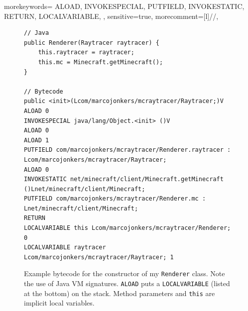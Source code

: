 \documentclass[]{article}
\begin{document}

{
  morekeywords={
    ALOAD,
    INVOKESPECIAL,
    PUTFIELD,
    INVOKESTATIC,
    RETURN,
    LOCALVARIABLE,
  },
  sensitive=true, %
  morecomment=[l]{//}, %
}
\begin{figure}
\begin{lstlisting}[breaklines,frame=single]
// Java
public Renderer(Raytracer raytracer) {
    this.raytracer = raytracer;
    this.mc = Minecraft.getMinecraft();
}

// Bytecode
public <init>(Lcom/marcojonkers/mcraytracer/Raytracer;)V
ALOAD 0
INVOKESPECIAL java/lang/Object.<init> ()V
ALOAD 0
ALOAD 1
PUTFIELD com/marcojonkers/mcraytracer/Renderer.raytracer : Lcom/marcojonkers/mcraytracer/Raytracer;
ALOAD 0
INVOKESTATIC net/minecraft/client/Minecraft.getMinecraft ()Lnet/minecraft/client/Minecraft;
PUTFIELD com/marcojonkers/mcraytracer/Renderer.mc : Lnet/minecraft/client/Minecraft;
RETURN
LOCALVARIABLE this Lcom/marcojonkers/mcraytracer/Renderer; 0
LOCALVARIABLE raytracer Lcom/marcojonkers/mcraytracer/Raytracer; 1
\end{lstlisting}
\caption[Example bytecode]{Example bytecode for the constructor of my \texttt{Renderer} class. Note the use of Java VM signatures. \texttt{ALOAD} puts a \texttt{LOCALVARIABLE} (listed at the bottom) on the stack. Method parameters and \texttt{this} are implicit local variables.}
\label{fig:bytecode}
\end{figure}
\end{document}
